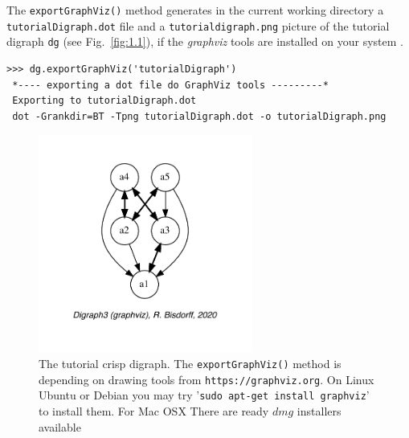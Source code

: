 The \texttt{exportGraphViz()} method generates in the current working directory a \texttt{tutorialDigraph.dot} file and a \texttt{tutorialdigraph.png} picture of the tutorial digraph \texttt{dg} (see Fig.~\vref{fig:1.1}), if the \emph{graphviz} tools are installed on your system \citep{graphviz}.
\begin{lstlisting}
>>> dg.exportGraphViz('tutorialDigraph')
 *---- exporting a dot file do GraphViz tools ---------*
 Exporting to tutorialDigraph.dot
 dot -Grankdir=BT -Tpng tutorialDigraph.dot -o tutorialDigraph.png
\end{lstlisting}
\begin{figure}[ht]
\sidecaption[t]
\includegraphics[width=7cm]{Figures/1-1-tutorialDigraph.pdf}
\caption[The tutorial crisp digraph]{The tutorial crisp digraph. The \texttt{exportGraphViz()} method is depending on drawing tools from \texttt{https://graphviz.org}. On Linux Ubuntu or Debian you may try '\texttt{sudo apt-get install graphviz}’ to install them. For Mac OSX There are ready $dmg$ installers available}
\label{fig:1.1}       %
\end{figure}

